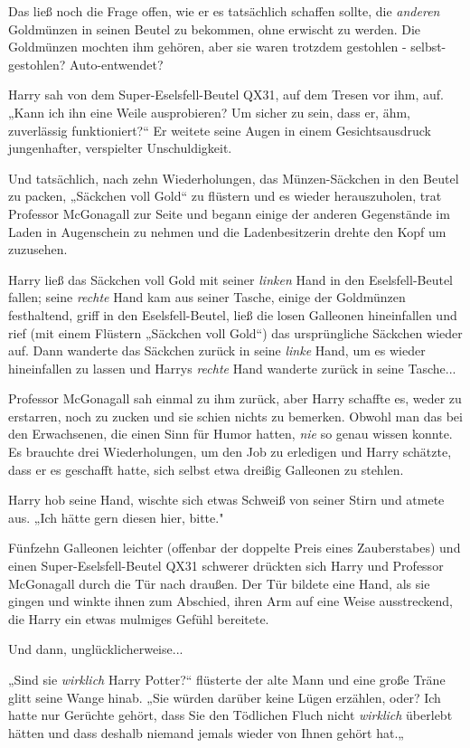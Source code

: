 {Das ließ noch die Frage offen, wie er es tatsächlich schaffen sollte, die \emph{anderen} Goldmünzen in seinen Beutel zu bekommen, ohne erwischt zu werden. Die Goldmünzen mochten ihm gehören, aber sie waren trotzdem gestohlen - selbst-gestohlen? Auto-entwendet?

Harry sah von dem Super-Eselsfell-Beutel QX31, auf dem Tresen vor ihm, auf. „Kann ich ihn eine Weile ausprobieren? Um sicher zu sein, dass er, ähm, zuverlässig funktioniert?“ Er weitete seine Augen in einem Gesichtsausdruck jungenhafter, verspielter Unschuldigkeit.

Und tatsächlich, nach zehn Wiederholungen, das Münzen-Säckchen in den Beutel zu packen, „Säckchen voll Gold“ zu flüstern und es wieder herauszuholen, trat Professor McGonagall zur Seite und begann einige der anderen Gegenstände im Laden in Augenschein zu nehmen und die Ladenbesitzerin drehte den Kopf um zuzusehen.

Harry ließ das Säckchen voll Gold mit seiner \emph{linken} Hand in den Eselsfell-Beutel fallen; seine \emph{rechte} Hand kam aus seiner Tasche, einige der Goldmünzen festhaltend, griff in den Eselsfell-Beutel, ließ die losen Galleonen hineinfallen und rief (mit einem Flüstern „Säckchen voll Gold“) das ursprüngliche Säckchen wieder auf. Dann wanderte das Säckchen zurück in seine \emph{linke} Hand, um es wieder hineinfallen zu lassen und Harrys \emph{rechte} Hand wanderte zurück in seine Tasche...

Professor McGonagall sah einmal zu ihm zurück, aber Harry schaffte es, weder zu erstarren, noch zu zucken und sie schien nichts zu bemerken. Obwohl man das bei den Erwachsenen, die einen Sinn für Humor hatten, \emph{nie} so genau wissen konnte. Es brauchte drei Wiederholungen, um den Job zu erledigen und Harry schätzte, dass er es geschafft hatte, sich selbst etwa dreißig Galleonen zu stehlen.

Harry hob seine Hand, wischte sich etwas Schweiß von seiner Stirn und atmete aus. „Ich hätte gern diesen hier, bitte."

Fünfzehn Galleonen leichter (offenbar der doppelte Preis eines Zauberstabes) und einen Super-Eselsfell-Beutel QX31 schwerer drückten sich Harry und Professor McGonagall durch die Tür nach draußen. Der Tür bildete eine Hand, als sie gingen und winkte ihnen zum Abschied, ihren Arm auf eine Weise ausstreckend, die Harry ein etwas mulmiges Gefühl bereitete.

Und dann, unglücklicherweise...

„Sind sie \emph{wirklich} Harry Potter?“ flüsterte der alte Mann und eine große Träne glitt seine Wange hinab. „Sie würden darüber keine Lügen erzählen, oder? Ich hatte nur Gerüchte gehört, dass Sie den Tödlichen Fluch nicht \emph{wirklich} überlebt hätten und dass deshalb niemand jemals wieder von Ihnen gehört hat.„

}
